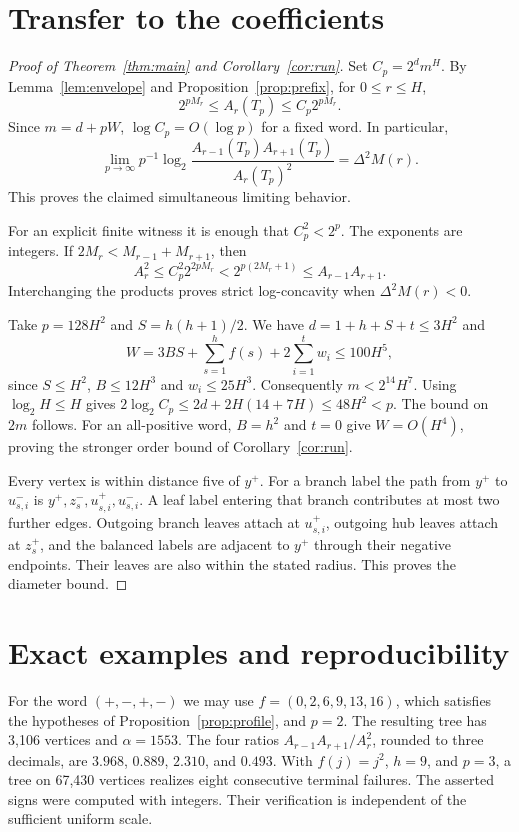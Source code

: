 \documentclass[11pt]{article}
\theoremstyle{definition}\newtheorem{example}[theorem]{Example}
\newcommand{\Dtwo}{\Delta^2}
\begin{document}
\section{Transfer to the coefficients}
\begin{proof}[Proof of Theorem~\ref{thm:main} and Corollary~\ref{cor:run}]
Set $C_p=2^d m^H$. By Lemma~\ref{lem:envelope} and Proposition~\ref{prop:prefix}, for $0\le r\le H$,
\begin{equation}\label{eq:squeeze}
     2^{pM_r}\le A_r(T_p)\le C_p 2^{pM_r}.
\end{equation}
Since $m=d+pW$, $\log C_p=O(\log p)$ for a fixed word. In particular,
\[
 \lim_{p\to\infty}p^{-1}\log_2\frac{A_{r-1}(T_p)A_{r+1}(T_p)}{A_r(T_p)^2}=\Dtwo M(r).
\]
This proves the claimed simultaneous limiting behavior.

For an explicit finite witness it is enough that $C_p^2<2^p$. The exponents are integers. If $2M_r<M_{r-1}+M_{r+1}$, then
\[
 A_r^2\le C_p^2 2^{2pM_r}<2^{p(2M_r+1)}\le A_{r-1}A_{r+1}.
\]
Interchanging the products proves strict log-concavity when $\Dtwo M(r)<0$.

Take $p=128H^2$ and $S=h(h+1)/2$. We have $d=1+h+S+t\le3H^2$ and
\[
 W=3BS+\sum_{s=1}^h f(s)+2\sum_{i=1}^t w_i\le100H^5,
\]
since $S\le H^2$, $B\le12H^3$ and $w_i\le25H^3$. Consequently $m<2^{14}H^7$. Using $\log_2 H\le H$ gives $2\log_2 C_p\le2d+2H(14+7H)\le48H^2<p$. The bound on $2m$ follows. For an all-positive word, $B=h^2$ and $t=0$ give $W=O(H^4)$, proving the stronger order bound of Corollary~\ref{cor:run}.

Every vertex is within distance five of $y^+$. For a branch label the path from $y^+$ to $u_{s,i}^-$ is $y^+,z_s^-,u_{s,i}^+,u_{s,i}^-$. A leaf label entering that branch contributes at most two further edges. Outgoing branch leaves attach at $u_{s,i}^+$, outgoing hub leaves attach at $z_s^+$, and the balanced labels are adjacent to $y^+$ through their negative endpoints. Their leaves are also within the stated radius. This proves the diameter bound.\end{proof}

\section{Exact examples and reproducibility}
For the word $(+,-,+,-)$ we may use $f=(0,2,6,9,13,16)$, which satisfies the hypotheses of Proposition~\ref{prop:profile}, and $p=2$. The resulting tree has 3,106 vertices and $\alpha=1553$. The four ratios $A_{r-1}A_{r+1}/A_r^2$, rounded to three decimals, are $3.968$, $0.889$, $2.310$, and $0.493$. With $f(j)=j^2$, $h=9$, and $p=3$, a tree on 67,430 vertices realizes eight consecutive terminal failures. The asserted signs were computed with integers. Their verification is independent of the sufficient uniform scale.
\end{document}
